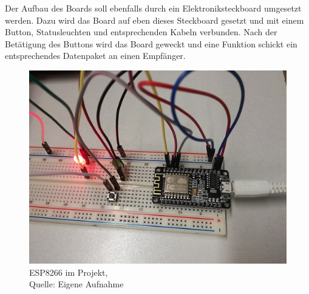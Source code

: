 Der Aufbau des Boards soll ebenfalls durch ein Elektroniksteckboard umgesetzt werden. Dazu wird das Board auf eben dieses Steckboard gesetzt und mit einem Button, Statusleuchten und entsprechenden Kabeln verbunden. Nach der Betätigung des Buttons wird das Board geweckt und eine Funktion schickt ein entsprechendes Datenpaket an einen Empfänger.
\begin{figure}[!htb]
	\centering
	\includegraphics[scale=0.6]{ESP8266.jpg}
	\caption[ESP8266 im Projekt]{ESP8266 im Projekt,\\ Quelle: Eigene Aufnahme}
\end{figure}
\newpage


 
